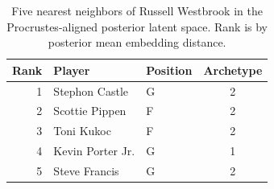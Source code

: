 \begin{table}[htbp]
  \centering\small
  \begin{tabular}{rllc}
    \toprule
    Rank & Player & Position & Archetype \\
    \midrule
    1 & Stephon Castle & G & 2 \\
    2 & Scottie Pippen & F & 2 \\
    3 & Toni Kukoc & F & 2 \\
    4 & Kevin Porter Jr. & G & 1 \\
    5 & Steve Francis & G & 2 \\
    \bottomrule
  \end{tabular}
  \caption{Five nearest neighbors of Russell Westbrook in the Procrustes-aligned posterior latent space. Rank is by posterior mean embedding distance.}
  \label{tab:Russell_Westbrook_neighbors}
\end{table}

